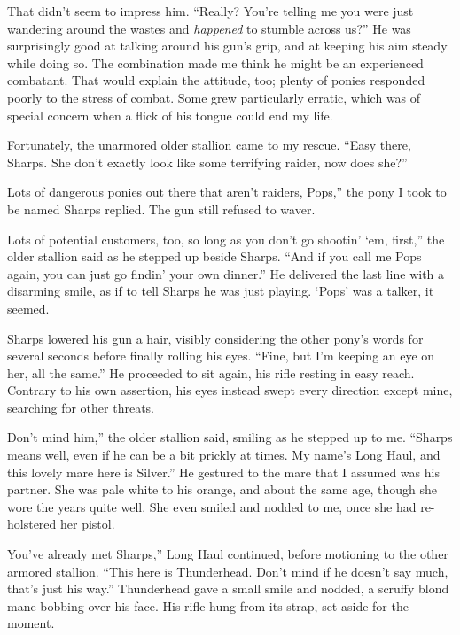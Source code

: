 That didn’t seem to impress him. “Really? You’re telling me you were just wandering around the wastes and \textit{happened} to stumble across us?” He was surprisingly good at talking around his gun’s grip, and at keeping his aim steady while doing so. The combination made me think he might be an experienced combatant. That would explain the attitude, too; plenty of ponies responded poorly to the stress of combat. Some grew particularly erratic, which was of special concern when a flick of his tongue could end my life.

Fortunately, the unarmored older stallion came to my rescue. “Easy there, Sharps. She don’t exactly look like some terrifying raider, now does she?”

\leavevmode{}Lots of dangerous ponies out there that aren’t raiders, Pops,” the pony I took to be named Sharps replied. The gun still refused to waver.

\leavevmode{}Lots of potential customers, too, so long as you don’t go shootin’ ‘em, first,” the older stallion said as he stepped up beside Sharps. “And if you call me Pops again, you can just go findin’ your own dinner.” He delivered the last line with a disarming smile, as if to tell Sharps he was just playing. ‘Pops’ was a talker, it seemed.

Sharps lowered his gun a hair, visibly considering the other pony’s words for several seconds before finally rolling his eyes. “Fine, but I’m keeping an eye on her, all the same.” He proceeded to sit again, his rifle resting in easy reach. Contrary to his own assertion, his eyes instead swept every direction except mine, searching for other threats.

\leavevmode{}Don’t mind him,” the older stallion said, smiling as he stepped up to me. “Sharps means well, even if he can be a bit prickly at times. My name’s Long Haul, and this lovely mare here is Silver.” He gestured to the mare that I assumed was his partner. She was pale white to his orange, and about the same age, though she wore the years quite well. She even smiled and nodded to me, once she had re-holstered her pistol.

\leavevmode{}You’ve already met Sharps,” Long Haul continued, before motioning to the other armored stallion. “This here is Thunderhead. Don’t mind if he doesn’t say much, that’s just his way.” Thunderhead gave a small smile and nodded, a scruffy blond mane bobbing over his face. His rifle hung from its strap, set aside for the moment.

